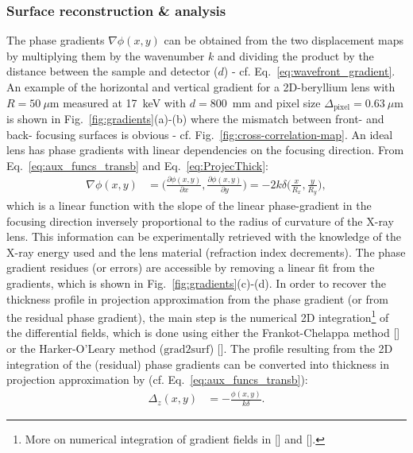 \begin{refsection}
\subsubsection*{Surface reconstruction \& analysis}

The phase gradients $\nabla\phi(x,y)$ can be obtained from the two displacement maps by multiplying them by the wavenumber $k$ and dividing the product by the distance between the sample and detector ($d$) - cf. Eq.~\ref{eq:wavefront_gradient}. An example of the horizontal and vertical gradient for a 2D-beryllium lens with $R=50~\mu$m measured at 17~keV with $d=800$~mm and pixel size $\Delta_\text{pixel}= 0.63~\mu$m is shown in Fig.~\ref{fig:gradients}(a)-(b) where the mismatch between front- and back- focusing surfaces is obvious - cf. Fig.~\ref{fig:cross-correlation-map}. An ideal lens has phase gradients with linear dependencies on the focusing direction. From Eq.~\ref{eq:aux_funcs_transb} and Eq.~\ref{eq:ProjecThick}: 
\begin{align}
    \nabla\phi(x,y) & = \Bigg(\frac{\partial \phi(x,y)}{\partial x},\frac{\partial \phi(x,y)}{\partial y}  \Bigg) = -2k\delta\Bigg(\frac{x}{R_x},\frac{y}{R_y}\Bigg),
\end{align}{}
which is a linear function with the slope of the linear phase-gradient in the focusing direction inversely proportional to the radius of curvature of the X-ray lens. This information  can be experimentally retrieved with the knowledge of the X-ray energy used and the lens material (refraction index decrements). The phase gradient residues (or errors) are accessible by removing a linear fit from the gradients, which is shown in Fig.~\ref{fig:gradients}(c)-(d). In order to recover the thickness profile in projection approximation from the phase gradient (or from the residual phase gradient), the main step is the numerical 2D integration\footnote{More on numerical integration of gradient fields in [\cite{Huang2015}] and [\cite{Agrawal2006}].} of the differential fields, which is done using either the Frankot-Chelappa method [\cite{Frankot1988}] or the Harker-O'Leary method ($\text{grad2surf}$) [\cite{Harker2015}]. The profile resulting from the 2D integration of the (residual) phase gradients can be converted into thickness in projection approximation by (cf. Eq.~\ref{eq:aux_funcs_transb}):
\begin{align}\label{eq:recovered_thickness}
     \Delta_z(x,y)&=-\frac{\phi(x,y)}{k\delta}.

\end{align}
\end{refsection}
